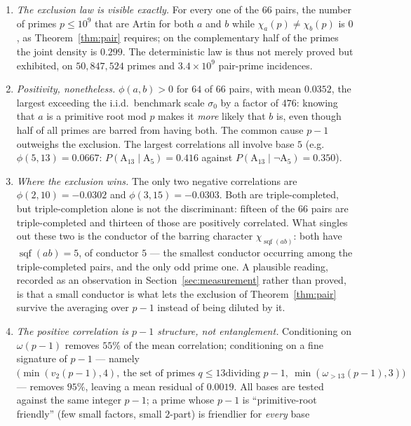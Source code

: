 \documentclass[11pt,reqno]{amsart}
\theoremstyle{plain}
\theoremstyle{definition}
\DeclareMathOperator{\sqf}{sqf}
\newcommand{\Art}{\mathrm{A}}
\begin{document}
\begin{enumerate}
  \item \emph{The exclusion law is visible exactly.} For every one of the $66$
    pairs, the number of primes $p \le 10^9$ that are Artin for both $a$ and
    $b$ while $\chi_a(p) \ne \chi_b(p)$ is $0$, as Theorem~\ref{thm:pair}
    requires; on the complementary half of the primes the joint density is
    $0.299$. The deterministic law is thus not merely proved but
    exhibited, on $50{,}847{,}524$ primes and $3.4 \times 10^9$ pair-prime
    incidences.
  \item \emph{Positivity, nonetheless.} $\phi(a,b) > 0$ for $64$ of $66$
    pairs, with mean $0.0352$, the largest exceeding the i.i.d.\ benchmark scale
$\sigma_0$ by a factor of $476$: knowing that $a$ is a
    primitive root mod $p$ makes it \emph{more} likely that $b$ is, even though
    half of all primes are barred from having both. The common cause $p-1$
    outweighs the exclusion. The largest correlations
    all involve base $5$ (e.g.\ $\phi(5,13) = 0.0667$:
    $P(\Art_{13} \mid \Art_5) = 0.416$ against
    $P(\Art_{13} \mid \lnot\Art_5) = 0.350$).
  \item \emph{Where the exclusion wins.} The only two negative
    correlations are $\phi(2,10) = -0.0302$ and $\phi(3,15) = -0.0303$. Both are triple-completed, but triple-completion alone is not the discriminant: fifteen of the $66$ pairs are triple-completed and thirteen of those are positively correlated. What singles out these two is the conductor of
    the barring character $\chi_{\sqf(ab)}$: both have $\sqf(ab) = 5$, of
    conductor $5$ --- the smallest conductor occurring among the triple-completed pairs, and the only odd prime one. A plausible reading, recorded as an observation in Section~\ref{sec:measurement} rather than proved, is that a small conductor is what lets the exclusion of Theorem~\ref{thm:pair} survive the averaging over $p-1$ instead of being diluted by it.
  \item \emph{The positive correlation is $p-1$ structure, not entanglement.}
    Conditioning on $\omega(p-1)$ removes $55\%$ of the mean correlation;
    conditioning on a fine signature of $p-1$ --- namely
    $\bigl(\min(v_2(p-1), 4),\ \text{the set of primes } q \le 13 \text{
    dividing } p-1,\ \min(\omega_{>13}(p-1), 3)\bigr)$ --- removes $95\%$,
    leaving a mean residual of $0.0019$. All bases are tested against the
    same integer $p - 1$; a prime whose $p-1$ is ``primitive-root friendly''
    (few small factors, small $2$-part) is friendlier for \emph{every} base

\end{enumerate}
\end{document}
